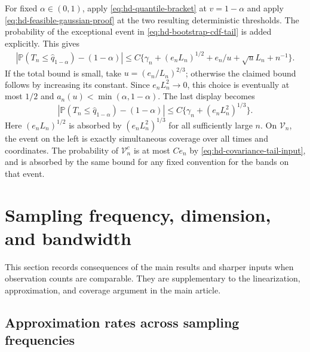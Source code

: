 \documentclass[10pt]{book}
\newcommand{\prob}{\mathbb{P}}
\numberwithin{equation}{section}
\begin{document}
For fixed $\alpha\in(0,1)$, apply \eqref{eq:hd-quantile-bracket} at
$v=1-\alpha$ and apply \eqref{eq:hd-feasible-gaussian-proof} at the
two resulting deterministic thresholds. The probability of the
exceptional event in \eqref{eq:hd-bootstrap-cdf-tail} is added explicitly.
This gives
\begin{align*}
 \left|\prob(T_n\le\widehat q_{1-\alpha})-(1-\alpha)\right|
 \le C\{\gamma_n+(e_nL_n)^{1/2}
                  +e_n/u+\sqrt uL_n+n^{-1}\}.
\end{align*}
If the total bound is small, take $u=(e_n/L_n)^{2/3}$; otherwise the
claimed bound follows by increasing its constant. Since
$e_nL_n^2\to0$, this choice is eventually at most $1/2$ and
$a_n(u)<\min(\alpha,1-\alpha)$. The last display becomes
\[
 \left|\prob(T_n\le\widehat q_{1-\alpha})-(1-\alpha)\right|
 \le C\{\gamma_n+(e_nL_n^2)^{1/3}\}.
\]
Here $(e_nL_n)^{1/2}$ is absorbed by $(e_nL_n^2)^{1/3}$ for all
sufficiently large $n$. On $\mathcal V_n$, the event on the left is
exactly simultaneous coverage over all times and coordinates. The
probability of $\mathcal V_n^c$ is at most $Ce_n$ by
\eqref{eq:hd-covariance-tail-input}, and is absorbed by the same bound
for any fixed convention for the bands on that event.

\section{Sampling frequency, dimension, and bandwidth}
\label{sec:sampling-density}\label{app:regime-proofs}

This section records consequences of the main results and sharper inputs
when observation counts are comparable. They are supplementary to the
linearization, approximation, and coverage argument in the main article.

\subsection{Approximation rates across sampling frequencies}
\label{sec:phase-transitions}\label{app:refined-sampling-bounds}
\end{document}
